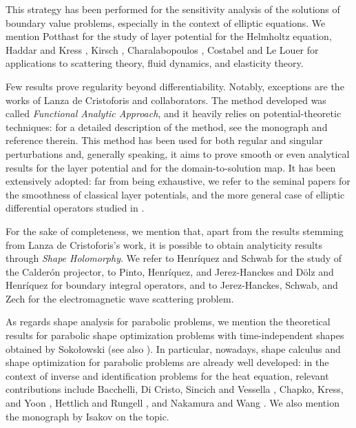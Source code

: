 \documentclass[11pt,reqno,a4paper]{amsart}
\theoremstyle{plain}
\theoremstyle{definition}
\begin{document}
This strategy has been performed for the sensitivity analysis of the solutions of boundary value problems, especially in the context of elliptic equations. We mention Potthast \cite{Pot94,Pot96} for the study of layer potential for the Helmholtz equation, Haddar and Kress \cite{HaKr04}, Kirsch \cite{Kir93}, Charalabopoulos \cite{Chara95}, Costabel and Le Louer \cite{CoLeLo12I,CoLeLo12II} for applications to scattering theory, fluid dynamics, and elasticity theory.  

Few results prove regularity beyond differentiability. Notably, exceptions are the works of Lanza de Cristoforis and collaborators. The method developed was called \textit{Functional Analytic Approach}, and it heavily relies on potential-theoretic techniques: for a detailed description of the method, see the monograph \cite{DaLaMuBook} and reference therein. This method has been used for both regular and singular perturbations and, generally speaking, it aims to prove smooth or even analytical results for the layer potential and for the domain-to-solution map. It has been extensively adopted: far from being exhaustive, we refer to the seminal papers \cite{La07, LaRo04,LaRo08} for the smoothness of classical layer potentials, and the more general case of elliptic differential operators studied in \cite{DaLa10}.

For the sake of completeness, we mention that, apart from the results stemming from Lanza de Cristoforis's work, it is possible to obtain analyticity results through \textit{Shape Holomorphy}. We refer to Henr\'iquez and Schwab \cite{HeSc21} for the study of the Calder\'on projector, to Pinto, Henr\'iquez, and Jerez-Hanckes \cite{PiHeJe24} and D\"olz and Henr\'iquez \cite{DoHe24} for boundary integral operators, and to Jerez-Hanckes, Schwab, and Zech \cite{JeScZe17} for the electromagnetic wave scattering problem.

As regards shape analysis for parabolic problems, we mention the theoretical results for parabolic shape optimization problems with time-independent shapes obtained by Soko{\l}owski \cite{So1988} (see also \cite{SoZo92, ElSo1996}). In particular, nowadays, shape calculus and shape optimization for parabolic problems are already well developed: in the context of inverse and identification problems for the
heat equation, relevant contributions include Bacchelli,
Di Cristo, Sincich and Vessella \cite{BaDiSiVe14}, Chapko, Kress, and Yoon \cite{ChKrYoo98,ChKrYoo99}, Hettlich and Rungell \cite{HeRu01}, and Nakamura and Wang \cite{NaWa15,NaWa17}. We also mention the monograph by Isakov \cite{Is98} on the topic.
\end{document}
